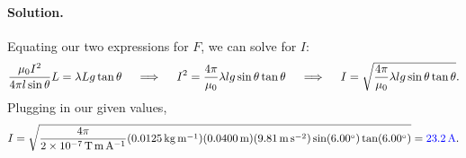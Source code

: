 \documentclass[11pt]{article}
\newcommand{\beq}{\begin{equation*}}
\newcommand{\eeq}{\end{equation*}}
\newenvironment{solution}
{
    \paragraph{Solution.}
    \ignorespaces
}
{
    \bigskip
}
\newcommand{\qimplies}{\quad \implies \quad}
\begin{document}
\begin{solution}
	Equating our two expressions for $F$, we can solve for $I$:
	\beq
		\frac{\muo I^2}{4\pi l \sin\tht} L = \lam L g \tan\tht
		\qimplies
		I^2 = \frac{4\pi}{\muo} \lam l g \sin\tht \tan\tht
		\qimplies
		I = \sqrt{\frac{4\pi}{\muo} \lam l g \sin\tht \tan\tht}.
	\eeq
	Plugging in our given values,
	\beq
		I = \sqrt{\frac{4\pi}{\SI{2e-7}{\tesla\meter\per\ampere}} (\SI{0.0125}{\kg\per\meter}) (\SI{0.0400}{\meter}) (\SI{9.81}{\meter\per\square\second}) \sin(\SI{6.00}{\degree}) \tan(\SI{6.00}{\degree})}
		= {\color{blue} \SI{23.2}{\ampere}}.
	\eeq
	
	
\end{solution}

\vfill 
\end{document}
